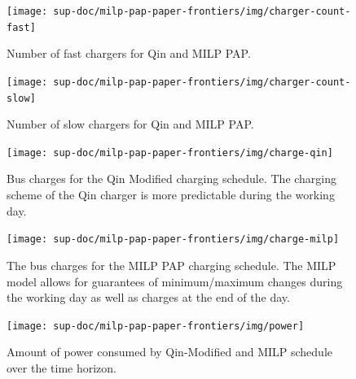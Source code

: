 \documentclass[ee,thesis]{usuthesis}
\begin{document}
\begin{subfigures}
    \begin{figure}[htpb]
    \centering
        \texttt{[image: sup-doc/milp-pap-paper-frontiers/img/charger-count-fast]}
        \caption{Number of fast chargers for Qin and MILP PAP.}
        \label{subfig:fast-charger-usage}
    \end{figure}

    \hfill

    \begin{figure}[!ht]
    \centering
        \texttt{[image: sup-doc/milp-pap-paper-frontiers/img/charger-count-slow]}
        \caption{Number of slow chargers for Qin and MILP PAP.}
        \label{subfig:slow-charger-usage}
    \end{figure}
\end{subfigures}

\begin{subfigures}
    \begin{figure}[htpb]
    \centering
        \texttt{[image: sup-doc/milp-pap-paper-frontiers/img/charge-qin]}
        \caption{Bus charges for the Qin Modified charging schedule. The charging scheme of the Qin charger is more predictable during the working day.}
        \label{subfig:qin-charge}
    \end{figure}

    \hfill

    \begin{figure}[htpb]
    \centering
        \texttt{[image: sup-doc/milp-pap-paper-frontiers/img/charge-milp]}
        \caption{The bus charges for the MILP PAP charging schedule. The MILP model allows for guarantees of minimum/maximum changes during the working day as well as charges at the end of the day.}
        \label{subfig:milp-charge}
    \end{figure}
\end{subfigures}

\begin{figure}[htpb]
\centering
    \texttt{[image: sup-doc/milp-pap-paper-frontiers/img/power]}
    \caption{Amount of power consumed by Qin-Modified and MILP schedule over the time horizon.}
    \label{fig:power-usage}
\end{figure}
\end{document}
